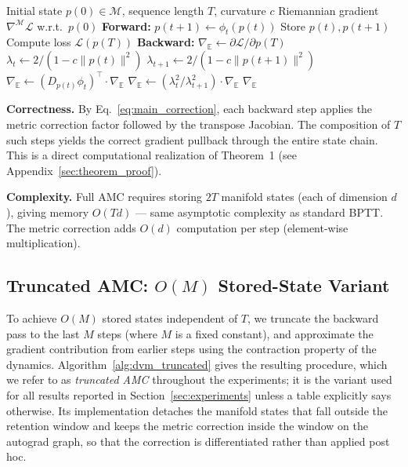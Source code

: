 \documentclass[a4paper,fleqn]{cas-dc}
\begin{document}
\begin{algorithm}[htbp]
\footnotesize
\caption{Full AMC with Per-Step Riemannian Correction}
\label{alg:dvm_full}
\begin{algorithmic}[1]
\Require Initial state $p(0) \in \mathcal{M}$, sequence length $T$, curvature $c$
\Ensure Riemannian gradient $\nabla^{\mathcal{M}}\mathcal{L}$ w.r.t.\ $p(0)$
\State \textbf{Forward:}
    \State $p(t+1) \leftarrow \phi_t(p(t))$ 
    \State Store $p(t), p(t+1)$
\EndFor
\State Compute loss $\mathcal{L}(p(T))$
\State \textbf{Backward:}
\State $\nabla_{\mathbb{E}} \leftarrow \partial\mathcal{L}/\partial p(T)$ 
    \State $\lambda_t \leftarrow 2/(1 - c\|p(t)\|^2)$
    \State $\lambda_{t+1} \leftarrow 2/(1 - c\|p(t+1)\|^2)$
    \State $\nabla_{\mathbb{E}} \leftarrow (D_{p(t)}\phi_t)^\top \cdot \nabla_{\mathbb{E}}$ 
    \State $\nabla_{\mathbb{E}} \leftarrow (\lambda_t^2 / \lambda_{t+1}^2) \cdot \nabla_{\mathbb{E}}$ 
\EndFor
\State \Return $\nabla_{\mathbb{E}}$
\end{algorithmic}
\end{algorithm}

\textbf{Correctness.} By Eq.~\eqref{eq:main_correction}, each backward step applies the metric correction factor followed by the transpose Jacobian. The composition of $T$ such steps yields the correct gradient pullback through the entire state chain. This is a direct computational realization of Theorem~1 (see Appendix~\ref{sec:theorem_proof}).

\textbf{Complexity.} Full AMC requires storing $2T$ manifold states (each of dimension $d$), giving memory $O(Td)$ — same asymptotic complexity as standard BPTT. The metric correction adds $O(d)$ computation per step (element-wise multiplication).

\subsection{Truncated AMC: \texorpdfstring{$O(M)$}{O(M)} Stored-State Variant}

To achieve $O(M)$ stored states independent of $T$, we truncate the backward pass to the last $M$ steps (where $M$ is a fixed constant), and approximate the gradient contribution from earlier steps using the contraction property of the dynamics. Algorithm~\ref{alg:dvm_truncated} gives the resulting procedure, which we refer to as \emph{truncated AMC} throughout the experiments; it is the variant used for all results reported in Section~\ref{sec:experiments} unless a table explicitly says otherwise. Its implementation detaches the manifold states that fall outside the retention window and keeps the metric correction inside the window on the autograd graph, so that the correction is differentiated rather than applied post hoc.
\end{document}
